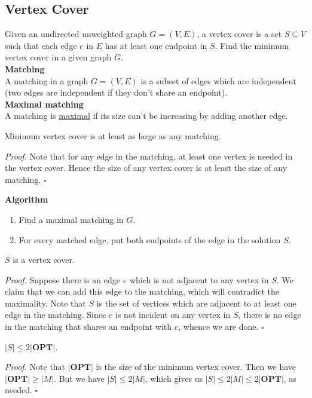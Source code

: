 \documentclass[a4paper]{article}
\newenvironment{proof}{\begin{breakbox}\textit{Proof.}}{\hfill$\square$\end{breakbox}}
\newcommand{\nl}{\vspace{0.2cm}\\}
\newcommand{\OPT}{\mathbf{OPT}}
\begin{document}
\subsection{Vertex Cover}

Given an undirected unweighted graph $G = (V, E)$, a vertex cover is a set $S \subseteq V$ such that each edge $e$ in $E$ has at least one endpoint in $S$. Find the minimum vertex cover in a given
graph $G$.\nl

\textbf{Matching}\nl
A matching in a graph $G = (V, E)$ is a subset of edges which are independent (two edges are independent if they don't share an endpoint).\nl

\textbf{Maximal matching}\nl
A matching is \underline{maximal} if its size can't be increasing by adding another edge.\nl

\begin{claim}
    Minimum vertex cover is at least as large as any matching.
\end{claim}
\begin{proof}
    Note that for any edge in the matching, at least one vertex is needed in the vertex cover. Hence the size of any vertex cover is at least the size of any matching.
\end{proof}

\textbf{Algorithm}
\begin{enumerate}
    \item Find a maximal matching in $G$.
    \item For every matched edge, put both endpoints of the edge in the solution $S$.
\end{enumerate}

\begin{claim}
    $S$ is a vertex cover.
\end{claim}

\begin{proof}
    Suppose there is an edge $e$ which is not adjacent to any vertex in $S$. We claim that we can add this edge to the matching, which will contradict the maximality. Note that $S$ is the set of vertices
    which are adjacent to at least one edge in the matching. Since $e$ is not incident on any vertex in $S$, there is no edge in the matching that shares an endpoint with $e$, whence we are done.
\end{proof}

\begin{claim}
    $|S| \le 2 |\OPT|$.
\end{claim}
\begin{proof}
    Note that $|\OPT|$ is the size of the minimum vertex cover. Then we have $|\OPT| \ge |M|$. But we have $|S| \le 2|M|$, which gives us $|S| \le 2|M| \le 2|\OPT|$, as needed. 
\end{proof}
\end{document}
